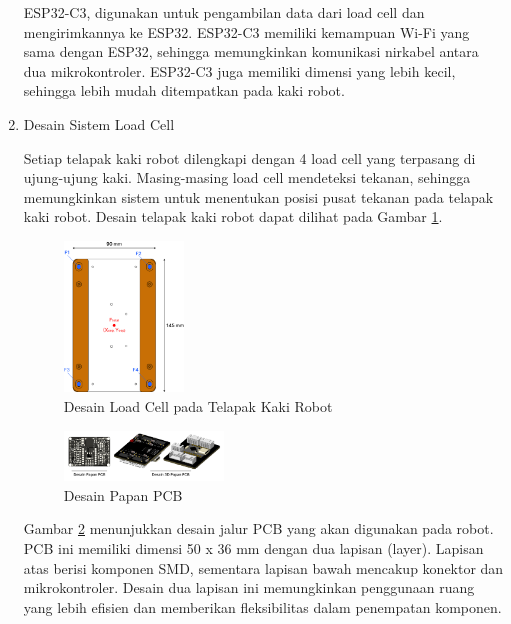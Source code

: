 \begin{enumerate}[label=\Alph*.]
    \hspace*{1em} ESP32-C3, digunakan untuk pengambilan data dari load cell dan mengirimkannya ke ESP32. ESP32-C3 memiliki kemampuan Wi-Fi yang sama dengan ESP32, sehingga memungkinkan komunikasi nirkabel antara dua mikrokontroler. ESP32-C3 juga memiliki dimensi yang lebih kecil, sehingga lebih mudah ditempatkan pada kaki robot. 

    \item Desain Sistem Load Cell
    \label{subsec:desainsistemloadcell}

    \hspace*{1em} Setiap telapak kaki robot dilengkapi dengan 4 load cell yang terpasang di ujung-ujung kaki. Masing-masing load cell mendeteksi tekanan, sehingga memungkinkan sistem untuk menentukan posisi pusat tekanan pada telapak kaki robot. Desain telapak kaki robot dapat dilihat pada Gambar \ref{fig:Dia_LoadCell}.

    \begin{figure} [h] \centering
        \includegraphics[width=0.3\textwidth]{gambar/Diagram_LoadCell.png}
        \caption{Desain Load Cell pada Telapak Kaki Robot}
        \label{fig:Dia_LoadCell}
    \end{figure}
    
    \begin{figure} [h] \centering
      \includegraphics[width=0.4\textwidth]{gambar/Desain_PCB.png}
      \caption{Desain Papan PCB}
      \label{fig:Desain_PCB}
    \end{figure}

    \hspace*{1em} Gambar \ref{fig:Desain_PCB} menunjukkan desain jalur PCB yang akan digunakan pada robot. PCB ini memiliki dimensi 50 x 36 mm dengan dua lapisan (layer). Lapisan atas berisi komponen SMD, sementara lapisan bawah mencakup konektor dan mikrokontroler. Desain dua lapisan ini memungkinkan penggunaan ruang yang lebih efisien dan memberikan fleksibilitas dalam penempatan komponen.  


\end{enumerate}
